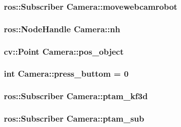 \hypertarget{classCamera_a81ec320a1f88feb728a21c6f7f57ebd8}{
\subsubsection[{movewebcamrobot}]{\setlength{\rightskip}{0pt plus 5cm}ros\-::\-Subscriber Camera\-::movewebcamrobot}}\label{classCamera_a81ec320a1f88feb728a21c6f7f57ebd8}
\hypertarget{classCamera_a8e5072bfde6efd4cb45a7231cca8ed52}{
\subsubsection[{nh}]{\setlength{\rightskip}{0pt plus 5cm}ros\-::\-Node\-Handle Camera\-::nh}}\label{classCamera_a8e5072bfde6efd4cb45a7231cca8ed52}
\hypertarget{classCamera_a3c133f08d9bc8154927d9105984f2ce9}{
\subsubsection[{pos\-\_\-object}]{\setlength{\rightskip}{0pt plus 5cm}cv\-::\-Point Camera\-::pos\-\_\-object\hspace{0.3cm}{\ttfamily [static]}}}\label{classCamera_a3c133f08d9bc8154927d9105984f2ce9}
\hypertarget{classCamera_a17309254cbc79d0b0e8eb569d70131f6}{
\subsubsection[{press\-\_\-buttom}]{\setlength{\rightskip}{0pt plus 5cm}int Camera\-::press\-\_\-buttom = 0\hspace{0.3cm}{\ttfamily [static]}}}\label{classCamera_a17309254cbc79d0b0e8eb569d70131f6}
\hypertarget{classCamera_a8c9fec85e18c979baa250cc8582a6f30}{
\subsubsection[{ptam\-\_\-kf3d}]{\setlength{\rightskip}{0pt plus 5cm}ros\-::\-Subscriber Camera\-::ptam\-\_\-kf3d}}\label{classCamera_a8c9fec85e18c979baa250cc8582a6f30}
\hypertarget{classCamera_a353766709ed7bdd512b720bdbea0d971}{
\subsubsection[{ptam\-\_\-sub}]{\setlength{\rightskip}{0pt plus 5cm}ros\-::\-Subscriber Camera\-::ptam\-\_\-sub}}\label{classCamera_a353766709ed7bdd512b720bdbea0d971}
